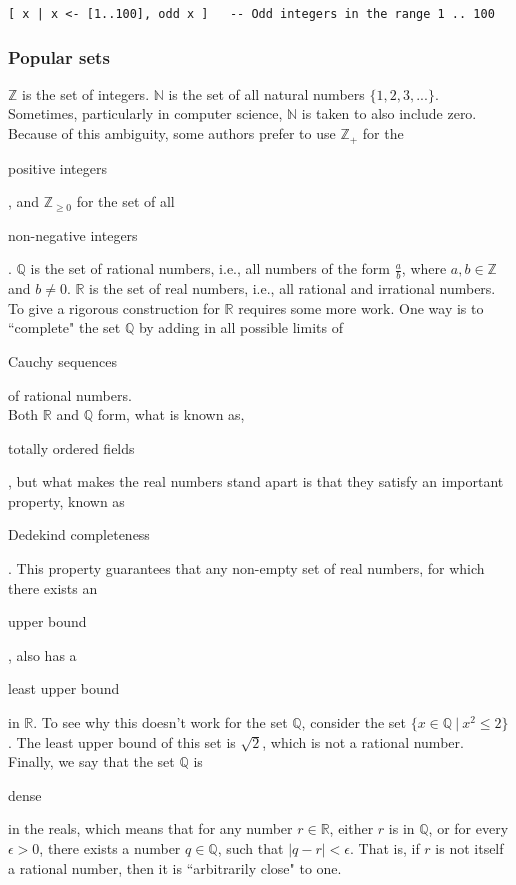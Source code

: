 \documentclass[11pt]{article}
\theoremstyle{plain}
\theoremstyle{definition}
\begin{document}
\begin{verbatim}
[ x | x <- [1..100], odd x ]   -- Odd integers in the range 1 .. 100
\end{verbatim}

\subsubsection*{Popular sets}

$ \mathbb{Z} $ is the set of integers. 
$ \mathbb{N} $ is the set of all natural numbers $ \{ 1, 2, 3, ... \} $. Sometimes, particularly in computer science, $ \mathbb{N} $ is taken to also include zero. Because of this ambiguity, some authors prefer to use $ \mathbb{Z}_+ $ for the \begin{em}positive integers\end{em}, and $ \mathbb{Z}_{\ge 0} $ for the set of all \begin{em}non-negative integers\end{em}.
$ \mathbb{Q} $ is the set of rational numbers, i.e., all numbers of the form $ \frac{a}{b} $, where $ a, b \in \mathbb{Z} $ and $ b \neq 0 $.
$ \mathbb{R} $ is the set of real numbers, i.e., all rational and irrational numbers. 
To give a rigorous construction for $ \mathbb{R} $ requires some more work. One way is to ``complete" the set $ \mathbb{Q} $ by adding in all possible limits of \begin{em}Cauchy sequences\end{em} of rational numbers. \\

\noindent Both $ \mathbb{R} $ and $ \mathbb{Q} $ form, what is known as, \begin{em}totally ordered fields\end{em}, but what makes the real numbers stand apart is that they satisfy an important property, known as \begin{em}Dedekind completeness\end{em}.
This property guarantees that any non-empty set of real numbers, for which there exists an \begin{em}upper bound\end{em}, also has a \begin{em}least upper bound\end{em} in $ \mathbb{R} $.
To see why this doesn't work for the set $ \mathbb{Q} $, consider the set $ \{ x \in \mathbb{Q} \ | \ x^2 \le 2 \} $. The least upper bound of this set is $ \sqrt{2} $, which is not a rational number.
Finally, we say that the set $ \mathbb{Q} $ is \begin{em}dense\end{em} in the reals, which means that for any number $ r \in \mathbb{R} $, either $ r $ is in $ \mathbb{Q} $, or for every $ \epsilon > 0$, there exists a number $ q \in \mathbb{Q} $, such that $ | q - r | < \epsilon $. That is, if $ r $ is not itself a rational number, then it is ``arbitrarily close" to one.
\end{document}

